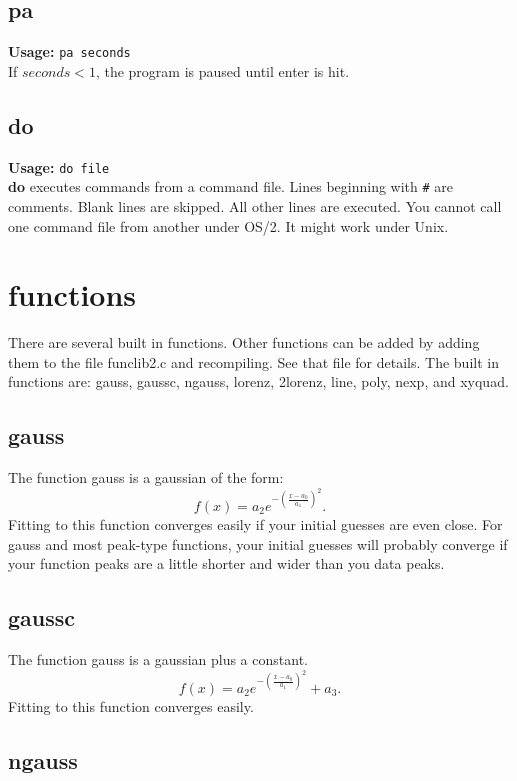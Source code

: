 \subsection{pa}      {\bf Usage: } {\tt  pa seconds} \\

 If $seconds < 1$, the program is paused until enter is hit.

\subsection{do}      {\bf Usage: } {\tt  do file} \\

 {\bf do} executes commands from a command file.  Lines 
 beginning with \verb+#+ are
 comments.  Blank lines are skipped.  All other lines are executed.
 You cannot call one command file from another under OS/2.  It
 might work under Unix.

\section{functions}

        There are several built in functions.  Other
 functions can be added by adding them to the file
 funclib2.c and recompiling.  See that file for details. 
 The built in functions are: gauss, gaussc, ngauss, lorenz,
 2lorenz, line, poly, nexp, and xyquad.

\subsection{gauss}

        The function gauss is a gaussian of the form:
\[
 f(x) = a_2e^{-(\frac{x-a_0}{a_1})^2}.
\]
 Fitting to this function
 converges easily if your initial guesses are even close.
 For gauss and most peak-type functions, your initial
 guesses will probably converge if your function peaks are a
 little shorter and wider than you data peaks.

\subsection{gaussc}

        The function gauss is a gaussian plus a constant.
\[
 f(x) = a_2e^{-(\frac{x-a_0}{a_1})^2} + a_3.
\]
 Fitting to this
 function converges easily.

\subsection{ngauss}


